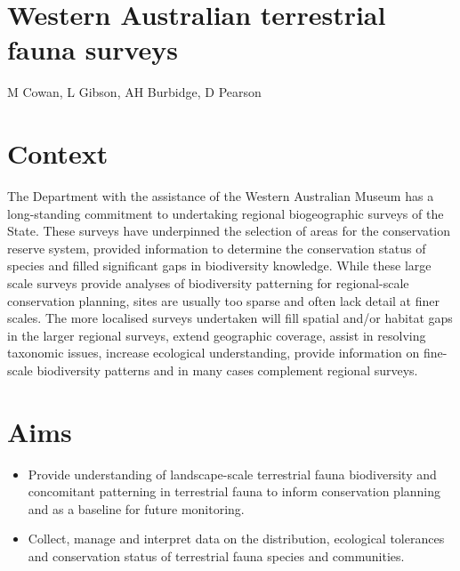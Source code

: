 \documentclass[version=last,
    paper=a4, %
    10pt, %
    usenames,
    dvipsnames,
    oneside, %
    headings=openany, %
    DIV=15 %
]{scrbook}
\begin{document}
\section*{Western Australian terrestrial fauna surveys
}

M Cowan, L Gibson, AH Burbidge, D Pearson


\section*{Context}
The Department with the assistance of the Western Australian Museum has
a long-standing commitment to undertaking regional biogeographic surveys
of the State. These surveys have underpinned the selection of areas for
the conservation reserve system, provided information to determine the
conservation status of species and filled significant gaps in
biodiversity knowledge. While these large scale surveys provide analyses
of biodiversity patterning for regional-scale conservation planning,
sites are usually too sparse and often lack detail at finer scales. The
more localised surveys undertaken will fill spatial and/or habitat gaps
in the larger regional surveys, extend geographic coverage, assist in
resolving taxonomic issues, increase ecological understanding, provide
information on fine-scale biodiversity patterns and in many cases
complement regional surveys.



\section*{Aims}
\begin{itemize}
\itemsep1pt\parskip0pt
\item
  Provide understanding of landscape-scale terrestrial fauna
  biodiversity and concomitant patterning in terrestrial fauna to inform
  conservation planning and as a baseline for future monitoring.
\item
  Collect, manage and interpret data on the distribution, ecological
  tolerances and conservation status of terrestrial fauna species and
  communities.
\end{itemize}
\end{document}
